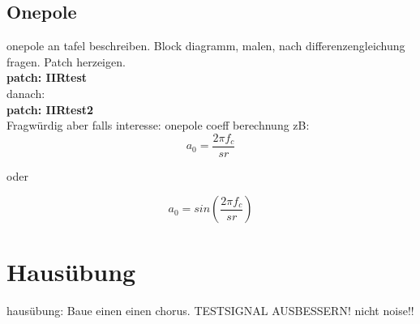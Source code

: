 \subsection{Onepole} %
\label{ssub:onepole}

onepole an tafel beschreiben. Block diagramm, malen, nach differenzengleichung fragen. Patch herzeigen.\\

\textbf{patch: IIRtest} \\
danach:\\
\textbf{patch: IIRtest2} \\

Fragwürdig aber falls interesse:
onepole coeff berechnung zB:\\

\begin{equation}
a_0 = \frac{2 \pi f_c} {sr}
\end{equation}

oder

\begin{equation}
a_0 = sin(\frac{2 \pi f_c} {sr})
\end{equation}


\section{Hausübung}

hausübung: Baue einen einen chorus. TESTSIGNAL AUSBESSERN! nicht noise!!

